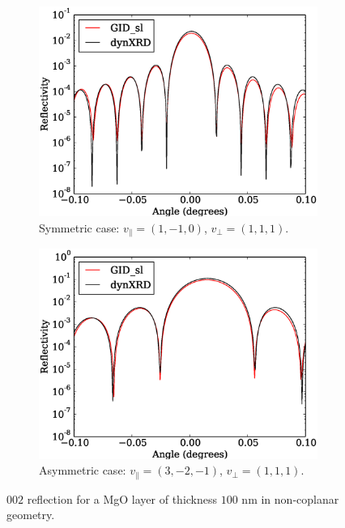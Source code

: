 \documentclass[12pt,oneside,notitlepage,abstracton,a4paper]{scrartcl}
\begin{document}
\begin{figure}[h]
 \centering
 \begin{subfigure}[h]{0.49\textwidth}
  \includegraphics[width=\textwidth]{pics/test2.eps}
  \caption{Symmetric case: $v_\parallel=(1, -1, 0)$, $v_\perp=(1,1,1)$.}
  \label{test2}
 \end{subfigure}
 \begin{subfigure}[h]{0.49\textwidth}
  \includegraphics[width=\textwidth]{pics/test7.eps}
  \caption{Asymmetric case: $v_\parallel=(3, -2, -1)$, $v_\perp=(1,1,1)$.}
  \label{test7}
 \end{subfigure}
 \caption{$002$ reflection for a MgO layer of thickness $100$ nm in non-coplanar geometry.}\label{testsMgO}
\end{figure}
\end{document}

